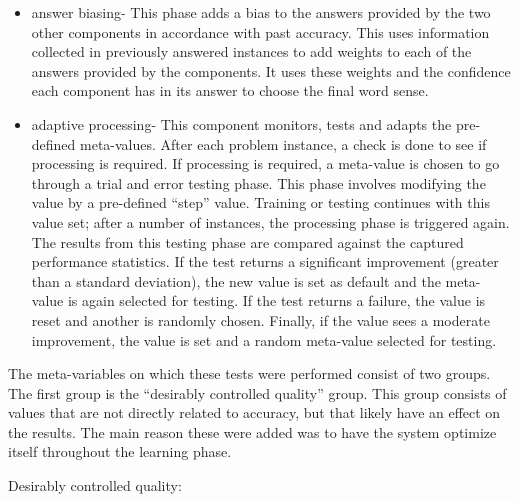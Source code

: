 \begin{itemize}
\item answer biasing- This phase adds a bias to the answers provided by the 
two other components in accordance with past accuracy.  This uses information 
collected in previously answered instances to add weights to each of the 
answers provided by the components. It uses these weights and the confidence 
each component has in its answer to choose the final word sense.      
\item adaptive processing- This component monitors, tests and adapts the 
pre-defined meta-values.  After each problem instance, a check is done to 
see if processing is required.  If processing is required, a meta-value is 
chosen to go through a trial and error testing phase.  This phase involves 
modifying the value by a pre-defined ``step'' value.  Training or testing 
continues with this value set; after a number of instances, the processing 
phase is triggered again. The results from this testing phase are compared 
against the captured performance statistics. If the test returns a significant 
improvement (greater than a standard deviation), the new value is set as 
default and the meta-value is again selected for testing. If the test 
returns a failure, the value is reset and another is randomly chosen. Finally, 
if the value sees a moderate improvement, the value is set and a random 
meta-value selected for testing.
\end{itemize}

The meta-variables on which these tests were performed consist of two groups. The
first group is the ``desirably controlled quality'' group.  This group
consists of values that are not directly related to accuracy, but that likely have an effect
on the results.  The main reason these were added was to have the system
optimize itself throughout the learning phase.

Desirably controlled quality:

